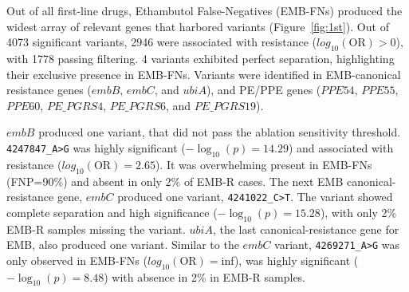 Out of all first-line drugs, Ethambutol False-Negatives (EMB-FNs) produced the widest array of relevant genes that harbored variants (Figure~\ref{fig:1st}). Out of 4073 significant variants, 2946 were associated with resistance ($log_{10}(\text{OR})>0$), with 1778 passing filtering. 4 variants exhibited perfect separation, highlighting their exclusive presence in EMB-FNs. Variants were identified in EMB-canonical resistance genes ($embB$, $embC$, and $ubiA$), and PE/PPE genes ($PPE54$, $PPE55$, $PPE60$, $PE\_PGRS4$, $PE\_PGRS6$, and $PE\_PGRS19$).

$embB$ produced one variant, that did not pass the ablation sensitivity threshold. \texttt{4247847\_A>G} was highly significant ($-\log_{10}(p)=14.29$) and associated with resistance ($log_{10}(\text{OR})=2.65$). It was overwhelming present in EMB-FNs (FNP=90\%) and absent in only 2\% of EMB-R cases. The next EMB canonical-resistance gene, $embC$ produced one variant, \texttt{4241022\_C>T}. The variant showed complete separation and high significance ($-\log_{10}(p)=15.28$), with only 2\% EMB-R samples missing the variant. $ubiA$, the last canonical-resistance gene for EMB, also produced one variant. Similar to the $embC$ variant, \texttt{4269271\_A>G} was only observed in EMB-FNs ($log_{10}(\text{OR})=$inf), was highly significant ($-\log_{10}(p)=8.48$) with absence in 2\% in EMB-R samples. 

